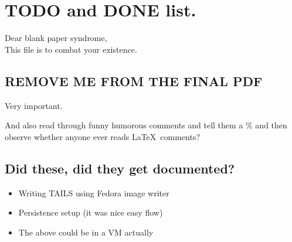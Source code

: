 \documentclass[../wifi-security.tex]{subfiles}
\begin{document}
\chapter{TODO and DONE list.}

Dear blank paper syndrome,\\This file is to combat your existence.

\section*{REMOVE ME FROM THE FINAL PDF}

Very important.

And also read through funny humorous comments and tell them a \% and then observe whether anyone ever reads \LaTeX\ comments?

\section*{Did these, did they get documented?}

\begin{itemize}
	\item{Writing TAILS using Fedora image writer}
	\item{Persistence setup (it was nice easy flow)}
	\item{The above could be in a VM actually}
\end{itemize}
\end{document}
